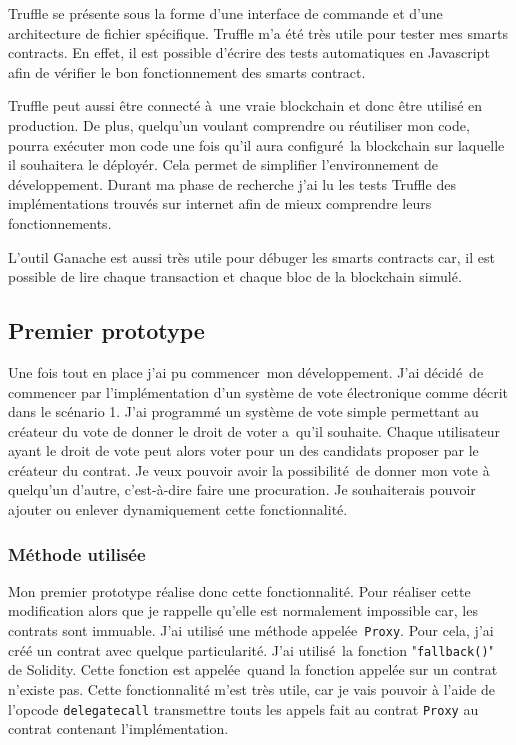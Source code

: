 Truffle se présente sous la forme d'une interface de commande et d'une architecture de fichier spécifique. Truffle m'a été très
utile pour tester mes smarts contracts. En effet, il est possible d'écrire des tests automatiques en Javascript afin
de vérifier le bon fonctionnement des smarts contract.

Truffle peut aussi être connecté à une vraie blockchain et donc être utilisé en production. De plus, quelqu'un voulant comprendre
ou réutiliser mon code, pourra exécuter mon code une fois qu'il aura configuré la blockchain sur laquelle il souhaitera le déployér. Cela permet 
de simplifier l'environnement de développement. Durant ma phase
de recherche j'ai lu les tests Truffle des implémentations trouvés sur internet afin de mieux comprendre leurs fonctionnements.

L'outil Ganache \cite{Ganache} est aussi très utile pour débuger les smarts contracts car, il est possible de lire chaque transaction et chaque bloc de la blockchain simulé.

\subsection{Premier prototype}

Une fois tout en place j'ai pu commencer mon développement. J'ai décidé de commencer par l'implémentation d'un système de vote 
électronique comme décrit dans le scénario 1. J'ai programmé un système de vote simple permettant au créateur du vote de donner
le droit de voter a qu'il souhaite. Chaque utilisateur ayant le droit de vote peut alors voter pour un des candidats proposer par
le créateur du contrat. Je veux pouvoir avoir la possibilité de donner mon vote à quelqu'un d'autre, c'est-à-dire faire une 
procuration. Je souhaiterais pouvoir ajouter ou enlever dynamiquement cette fonctionnalité.

\subsubsection{Méthode utilisée}

Mon premier prototype réalise donc cette fonctionnalité. Pour réaliser cette modification alors que je rappelle 
qu'elle est normalement impossible car, les contrats sont immuable. J'ai utilisé une méthode appelée \texttt{Proxy}. Pour cela, j'ai créé un contrat avec quelque particularité. J'ai utilisé la fonction "\texttt{fallback()}" de Solidity. Cette fonction est appelée quand la fonction appelée sur un contrat n'existe pas. Cette fonctionnalité m'est très utile, car je vais pouvoir à l'aide de l'opcode \texttt{delegatecall} transmettre touts les appels fait au contrat \texttt{Proxy} au contrat contenant l'implémentation.

